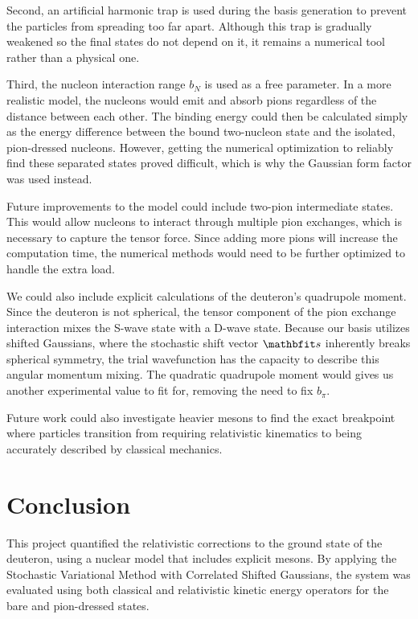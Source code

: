 \documentclass[a4paper,oneside,article,12pt]{memoir}
\begin{document}
Second, an artificial harmonic trap is used during the basis generation to prevent the particles from spreading too far apart. Although this trap is gradually weakened so the final states do not depend on it, it remains a numerical tool rather than a physical one.

Third, the nucleon interaction range $b_N$ is used as a free parameter. In a more realistic model, the nucleons would emit and absorb pions regardless of the distance between each other. The binding energy could then be calculated simply as the energy difference between the bound two-nucleon state and the isolated, pion-dressed nucleons. However, getting the numerical optimization to reliably find these separated states proved difficult, which is why the Gaussian form factor was used instead.

Future improvements to the model could include two-pion intermediate states. This would allow nucleons to interact through multiple pion exchanges, which is necessary to capture the tensor force. Since adding more pions will increase the computation time, the numerical methods would need to be further optimized to handle the extra load.

We could also include explicit calculations of the deuteron's quadrupole moment. Since the deuteron is not spherical, the tensor component of the pion exchange interaction mixes the S-wave state with a D-wave state. Because our basis utilizes shifted Gaussians, where the stochastic shift vector $\v{s}$ inherently breaks spherical symmetry, the trial wavefunction has the capacity to describe this angular momentum mixing. The quadratic quadrupole moment would gives us another experimental value to fit for, removing the need to fix $b_π$. 

Future work could also investigate heavier mesons to find the exact breakpoint where particles transition from requiring relativistic kinematics to being accurately described by classical mechanics.


\newpage
\chapter{Conclusion}
This project quantified the relativistic corrections to the ground state of the deuteron, using a nuclear model that includes explicit mesons. By applying the Stochastic Variational Method with Correlated Shifted Gaussians, the system was evaluated using both classical and relativistic kinetic energy operators for the bare and pion-dressed states.
\end{document}
